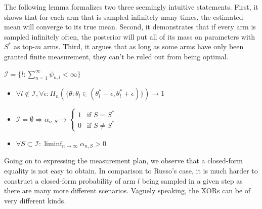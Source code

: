 The following lemma formalizes two three seemingly intuitive statements. First, it shows that for each arm that is sampled infinitely many times, the estimated mean will converge to its true mean. Second, it demonstrates that if every arm is sampled infinitely often, the posterior will put all of its mass on parameters with $S^*$ as top-$m$ arms. Third, it argues that as long as some arms have only been granted finite measurement, they can't be ruled out from being optimal.
\begin{lemma}\label{lemma:finite_measurement}
  $\mathcal{I} = \{l: \sum_{n=1}^\infty \psi_{n, l} < \infty\}$
  \begin{itemize}
    \item $\forall l \notin \mathcal{I}, \forall \epsilon: \Pi_n(\{\theta: \theta_l \in (\theta^*_l - \epsilon, \theta^*_l + \epsilon)\}) \rightarrow 1$
    \item $\mathcal{I} = \emptyset \Rightarrow
    \alpha_{n, S} \rightarrow \begin{cases}
      1 & \text{if } S = S^*\\
      0 & \text{if } S \neq S^*
    \end{cases}$
    \item $\forall S \subset \mathcal{I}: \liminf_{n \rightarrow \infty} \alpha_{n, S} > 0$
  \end{itemize}
\end{lemma}
Going on to expressing the measurement plan, we observe that a closed-form equality is not easy to obtain. In comparison to Russo's case, it is much harder to construct a closed-form probability of arm $l$ being sampled in a given step as there are many more different scenarios. Vaguely speaking, the XORs can be of very different kinds.


